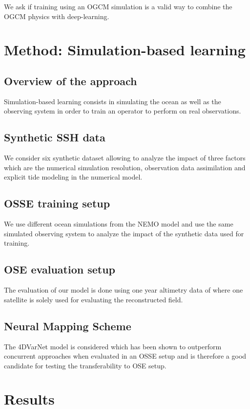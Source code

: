 \documentclass[draft]{agujournal2019}
\begin{document}
We ask if training using an OGCM simulation is a valid way to combine the OGCM physics with deep-learning.

\section{Method: Simulation-based learning}

\subsection{Overview of the approach}
Simulation-based learning consists in simulating the ocean as well as the observing system in order to train an operator to perform on real observations.

\subsection{Synthetic SSH data}
We consider six synthetic dataset allowing to analyze the impact of three factors which are the numerical simulation resolution, observation data assimilation and explicit tide modeling in the numerical model.

\subsection{OSSE training setup}
We use different ocean simulations from the NEMO model and use the same simulated observing system to analyze the impact of the synthetic data used for training.  

\subsection{OSE evaluation setup}
The evaluation of our model is done using one year altimetry data of where one satellite is solely used for evaluating the reconstructed field.

\subsection{Neural Mapping Scheme}
The 4DVarNet model is considered which has been shown to outperform concurrent approaches when evaluated in an OSSE setup and is therefore a good candidate for testing the transferability to OSE setup.



\section{Results}
\end{document}
